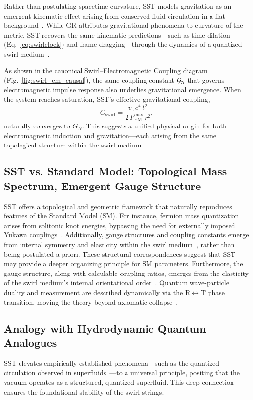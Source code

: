 \documentclass[10pt,reprint,aps,onecolumn,nofootinbib]{revtex4-2}
\begin{document}
    Rather than postulating spacetime curvature, SST models gravitation as an emergent kinematic effect arising from conserved fluid circulation in a flat background~\cite{3}. While GR attributes gravitational phenomena to curvature of the metric, SST recovers the same kinematic predictions—such as time dilation (Eq.~\ref{eq:swirlclock}) and frame-dragging—through the dynamics of a quantized swirl medium~\cite{1}.

    As shown in the canonical Swirl–Electromagnetic Coupling diagram (Fig.~\ref{fig:swirl_em_causal}), the same coupling constant \(\mathcal{G}_{\mkern-2mu\scriptscriptstyle\boldsymbol{\circlearrowleft}}\) that governs electromagnetic impulse response also underlies gravitational emergence. When the system reaches saturation, SST’s effective gravitational coupling,
    \[
        G_{\mathrm{swirl}} = \frac{v_{\!\circ} \, c^4 \, t^2}{2 \, F_{\!\text{EM}}^{\max} \, r^2},
    \]
    naturally converges to \(G_N\). This suggests a unified physical origin for both electromagnetic induction and gravitation—each arising from the same topological structure within the swirl medium.


\subsection*{SST vs. Standard Model: Topological Mass Spectrum, Emergent Gauge Structure}
    SST offers a topological and geometric framework that naturally reproduces features of the Standard Model (SM). For instance, fermion mass quantization arises from solitonic knot energies, bypassing the need for externally imposed Yukawa couplings~\cite{4}. Additionally, gauge structures and coupling constants emerge from internal symmetry and elasticity within the swirl medium~\cite{4}, rather than being postulated a priori. These structural correspondences suggest that SST may provide a deeper organizing principle for SM parameters.
 Furthermore, the gauge structure, along with calculable coupling ratios, emerges from the elasticity of the swirl medium's internal orientational order~\cite{4}. Quantum wave-particle duality and measurement are described dynamically via the R$\leftrightarrow$T phase transition, moving the theory beyond axiomatic collapse~\cite{1}.

\subsection*{Analogy with Hydrodynamic Quantum Analogues}
SST elevates empirically established phenomena—such as the quantized circulation observed in superfluids~\cite{1}—to a universal principle, positing that the vacuum operates as a structured, quantized superfluid. This deep connection ensures the foundational stability of the swirl strings.
\end{document}

